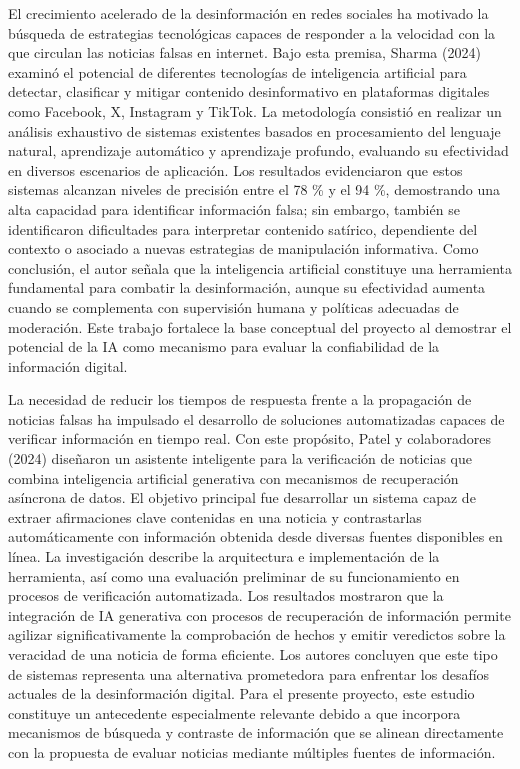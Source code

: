 \documentclass[12pt]{article}
\begin{document}
El crecimiento acelerado de la desinformación en redes sociales ha motivado la búsqueda de estrategias tecnológicas capaces de responder a la velocidad con la que circulan las noticias falsas en internet. Bajo esta premisa, Sharma (2024) examinó el potencial de diferentes tecnologías de inteligencia artificial para detectar, clasificar y mitigar contenido desinformativo en plataformas digitales como Facebook, X, Instagram y TikTok. La metodología consistió en realizar un análisis exhaustivo de sistemas existentes basados en procesamiento del lenguaje natural, aprendizaje automático y aprendizaje profundo, evaluando su efectividad en diversos escenarios de aplicación. Los resultados evidenciaron que estos sistemas alcanzan niveles de precisión entre el 78 \% y el 94 \%, demostrando una alta capacidad para identificar información falsa; sin embargo, también se identificaron dificultades para interpretar contenido satírico, dependiente del contexto o asociado a nuevas estrategias de manipulación informativa. Como conclusión, el autor señala que la inteligencia artificial constituye una herramienta fundamental para combatir la desinformación, aunque su efectividad aumenta cuando se complementa con supervisión humana y políticas adecuadas de moderación. Este trabajo fortalece la base conceptual del proyecto al demostrar el potencial de la IA como mecanismo para evaluar la confiabilidad de la información digital. 

La necesidad de reducir los tiempos de respuesta frente a la propagación de noticias falsas ha impulsado el desarrollo de soluciones automatizadas capaces de verificar información en tiempo real. Con este propósito, Patel y colaboradores (2024) diseñaron un asistente inteligente para la verificación de noticias que combina inteligencia artificial generativa con mecanismos de recuperación asíncrona de datos. El objetivo principal fue desarrollar un sistema capaz de extraer afirmaciones clave contenidas en una noticia y contrastarlas automáticamente con información obtenida desde diversas fuentes disponibles en línea. La investigación describe la arquitectura e implementación de la herramienta, así como una evaluación preliminar de su funcionamiento en procesos de verificación automatizada. Los resultados mostraron que la integración de IA generativa con procesos de recuperación de información permite agilizar significativamente la comprobación de hechos y emitir veredictos sobre la veracidad de una noticia de forma eficiente. Los autores concluyen que este tipo de sistemas representa una alternativa prometedora para enfrentar los desafíos actuales de la desinformación digital. Para el presente proyecto, este estudio constituye un antecedente especialmente relevante debido a que incorpora mecanismos de búsqueda y contraste de información que se alinean directamente con la propuesta de evaluar noticias mediante múltiples fuentes de información. 
\end{document}
